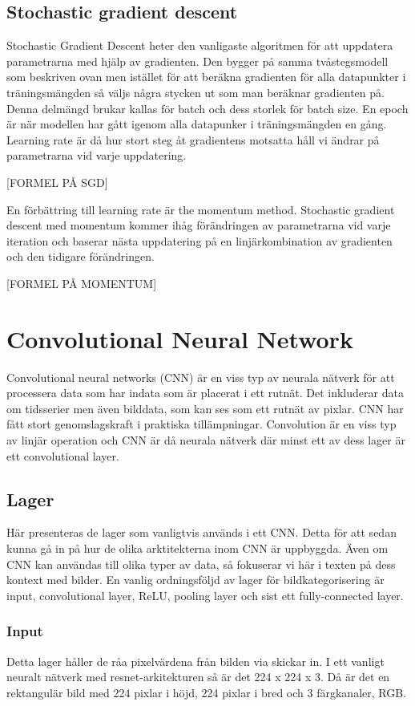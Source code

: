 \documentclass{kththesis}
\begin{document}
  \subsection{Stochastic gradient descent}
  Stochastic Gradient Descent heter den vanligaste algoritmen för att uppdatera parametrarna med hjälp av gradienten. Den bygger på samma tvåstegsmodell som beskriven ovan men istället för att beräkna gradienten för alla datapunkter i träningsmängden så väljs några stycken ut som man beräknar gradienten på. Denna delmängd brukar kallas för batch och dess storlek för batch size. En epoch är när modellen har gått igenom alla datapunker i träningsmängden en gång. Learning rate är då hur stort steg åt gradientens motsatta håll vi ändrar på parametrarna vid varje uppdatering.

  [FORMEL PÅ SGD]

  En förbättring till learning rate är the momentum method. Stochastic gradient descent med momentum kommer ihåg förändringen av parametrarna vid varje iteration och baserar nästa uppdatering på en linjärkombination av gradienten och den tidigare förändringen. 

  [FORMEL PÅ MOMENTUM]

  \section{Convolutional Neural Network}
  Convolutional neural networks (CNN) är en viss typ av neurala nätverk för att processera data som har indata som är placerat i ett rutnät. Det inkluderar data om tidsserier men även bilddata, som kan ses som ett rutnät av pixlar. CNN har fått stort genomslagskraft i praktiska tillämpningar. Convolution är en viss typ av linjär operation och CNN är då neurala nätverk där minst ett av dess lager är ett convolutional layer. 


    \subsection{Lager}
    Här presenteras de lager som vanligtvis används i ett CNN. 
    Detta för att sedan kunna gå in på hur de olika arktitekterna inom CNN är uppbyggda.
    Även om CNN kan användas till olika typer av data, så fokuserar vi här i texten på dess kontext med bilder.
    En vanlig ordningsföljd av lager för bildkategorisering är input, convolutional layer, ReLU, pooling layer och sist ett fully-connected layer.

      \subsubsection{Input}
      Detta lager håller de råa pixelvärdena från bilden via skickar in.
      I ett vanligt neuralt nätverk med resnet-arkitekturen så är det 224 x 224 x 3.
      Då är det en rektangulär bild med 224 pixlar i höjd, 224 pixlar i bred och 3 färgkanaler, RGB.
\end{document}
